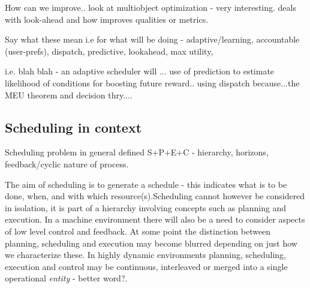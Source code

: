 How can we improve..
look at multiobject optimization \cite{silva04multiobjective} - very interesting. \cite{bresina95expected} deals with look-ahead and how improves qualities or metrics.

Say what these mean i.e for what will be doing - adaptive/learning, accountable (user-prefs), dispatch, predictive, lookahead, max utility,

i.e. blah blah - an adaptive scheduler will ... use of prediction to estimate likelihood of conditions for boosting future reward.. using dispatch because...the MEU theorem and decision thry....


\subsection{Scheduling in context}
Scheduling problem in general defined S+P+E+C - hierarchy, horizons, feedback/cyclic nature of process.

The aim of scheduling is to generate a schedule - this indicates what is to be done, when, and with which resource(s).Scheduling cannot however be considered in isolation, it is part of a hierarchy involving concepts such as planning and execution. In a machine environment there will also be a need to consider aspects of low level control and feedback.  
At some point the distinction between planning, scheduling and execution may become blurred depending on just how we characterize these. In highly dynamic environments planning, scheduling, execution and control may be continuous, interleaved or merged into a single operational \emph{entity} - better word?.

